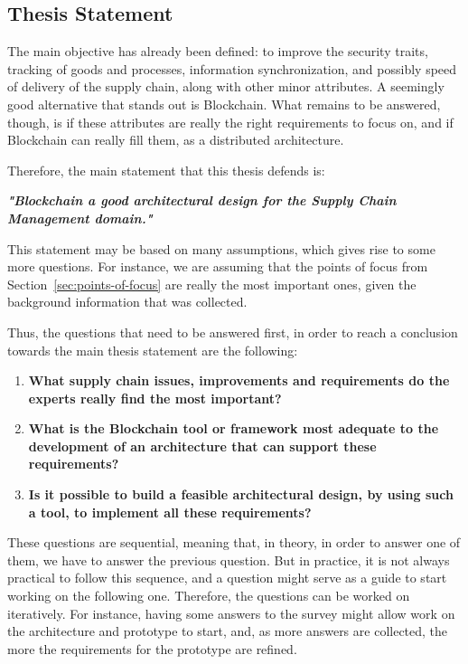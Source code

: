 \subsection{Thesis Statement}
\label{subsec:thesis-statement}
The main objective has already been defined: to improve the security traits, tracking of goods and processes, information synchronization, and possibly speed of delivery of the supply chain, along with other minor attributes. A seemingly good alternative that stands out is Blockchain. What remains to be answered, though, is if these attributes are really the right requirements to focus on, and if Blockchain can really fill them, as a distributed architecture.


Therefore, the main statement that this thesis defends is: 

\par \textbf{\textit{"Blockchain a good architectural design for the Supply Chain Management domain."}}

This statement may be based on many assumptions, which gives rise to some more questions. For instance, we are assuming that the points of focus from Section~\ref{sec:points-of-focus} are really the most important ones, given the background information that was collected.

Thus, the questions that need to be answered first, in order to reach a conclusion towards the main thesis statement are the following:
\begin{enumerate}
\item \textbf{What supply chain issues, improvements and requirements do the experts really find the most important?}
\item \textbf{What is the Blockchain tool or framework most adequate to the development of an architecture that can support these requirements?}
\item \textbf{Is it possible to build a feasible architectural design, by using such a tool, to implement all these requirements?}
\end{enumerate}

These questions are sequential, meaning that, in theory, in order to answer one of them, we have to answer the previous question. But in practice, it is not always practical to follow this sequence, and a question might serve as a guide to start working on the following one. Therefore, the questions can be worked on iteratively. For instance, having some answers to the survey might allow work on the architecture and prototype to start, and, as more answers are collected, the more the requirements for the prototype are refined.

